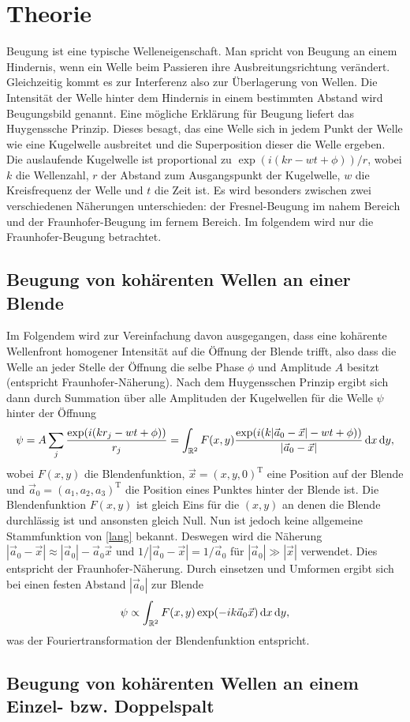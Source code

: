 
\section{Theorie}
\label{sec:Theorie}

Beugung ist eine typische Welleneigenschaft. Man spricht von Beugung an einem Hindernis, wenn ein Welle beim Passieren ihre Ausbreitungsrichtung verändert. Gleichzeitig kommt es zur Interferenz also zur Überlagerung von Wellen. Die Intensität der Welle hinter dem Hindernis in einem bestimmten Abstand wird Beugungsbild genannt. Eine mögliche Erklärung für Beugung liefert das Huygenssche Prinzip. Dieses besagt, das eine Welle sich in jedem Punkt der Welle wie eine Kugelwelle ausbreitet und die Superposition dieser die Welle ergeben. Die auslaufende Kugelwelle ist proportional zu $\exp(i (k r -w t+\phi))/r$, wobei $k$ die Wellenzahl, $r$ der Abstand zum Ausgangspunkt der Kugelwelle, $w$ die Kreisfrequenz der Welle und $t$ die Zeit ist. Es wird besonders zwischen zwei verschiedenen Näherungen unterschieden: der Fresnel-Beugung im nahem Bereich und der Fraunhofer-Beugung im fernem Bereich. Im folgendem wird nur die Fraunhofer-Beugung betrachtet.

\subsection{Beugung von kohärenten Wellen an einer Blende}

Im Folgendem wird zur Vereinfachung davon ausgegangen, dass eine kohärente Wellenfront homogener Intensität auf die Öffnung der Blende trifft, also dass die Welle an jeder Stelle der Öffnung die selbe Phase $\phi$ und Amplitude $A$ besitzt (entspricht Fraunhofer-Näherung). Nach dem Huygensschen Prinzip ergibt sich dann durch Summation über alle Amplituden der Kugelwellen für die Welle $\psi$ hinter der Öffnung
\begin{equation}
	\psi = A \sum \limits_j \frac{\exp(i (k r_j -w t+\phi))}{r_j}= \int_{\mathbb{R}^2} F(x, y) \frac{\exp(i (k |\vec{a}_0-\vec{x}| -w t+\phi))}{|\vec{a}_0-\vec{x}|} \mathop{}\!\mathrm{d} x \mathop{}\!\mathrm{d} y,\label{lang}
\end{equation}
wobei $F(x, y)$ die Blendenfunktion, $\vec{x}=(x,y,0)^\text{T}$ eine Position auf der Blende und $\vec{a}_0=(a_1,a_2,a_3)^\text{T}$ die Position eines Punktes hinter der Blende ist.
Die Blendenfunktion $F(x,y)$ ist gleich Eins für die $(x, y)$ an denen die Blende durchlässig ist und ansonsten gleich Null. Nun ist jedoch keine allgemeine Stammfunktion von \eqref{lang} bekannt. Deswegen wird die Näherung $|\vec{a}_0-\vec{x}| \approx |\vec{a}_0|- \vec{a}_0 \vec{x}$ und $1/|\vec{a}_0-\vec{x}|=1/\vec{a}_0 $ für $|\vec{a}_0|\gg |\vec{x}|$ verwendet. Dies entspricht der Fraunhofer-Näherung. Durch einsetzen und Umformen ergibt sich bei einen festen Abstand $|\vec{a}_0|$ zur Blende
\begin{equation}
	\psi \propto \int_{\mathbb{R}^2} F(x,y) \exp(-i k \vec{a}_0 \vec{x}) \mathop{}\!\mathrm{d} x \mathop{}\!\mathrm{d} y,
\end{equation}
was der Fouriertransformation der Blendenfunktion entspricht.

\subsection{Beugung von kohärenten Wellen an einem Einzel- bzw. Doppelspalt}
